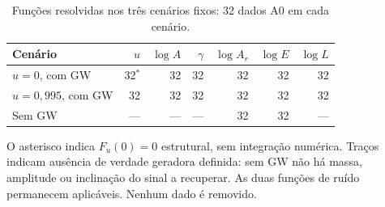 \begin{table}[htbp]
\centering
\caption{Funções resolvidas nos três cenários fixos: 32 dados A0 em cada cenário.}
\label{tab:c07-fixed-resolucao}
\begingroup\small\setlength{\tabcolsep}{4pt}
\begin{tabular}{@{}lrrrrrr@{}}
\toprule
Cenário & $u$ & $\log A$ & $\gamma$ & $\log A_r$ & $\log E$ & $\log L$ \\
\midrule
$u=0$, com GW & 32$^\ast$ & 32 & 32 & 32 & 32 & 32 \\
$u=0{,}995$, com GW & 32 & 32 & 32 & 32 & 32 & 32 \\
Sem GW & --- & --- & --- & 32 & 32 & --- \\
\bottomrule
\end{tabular}
\endgroup
\par\smallskip\begin{minipage}{0.96\textwidth}\footnotesize O asterisco indica $F_u(0)=0$ estrutural, sem integração numérica. Traços indicam ausência de verdade geradora definida: sem GW não há massa, amplitude ou inclinação do sinal a recuperar. As duas funções de ruído permanecem aplicáveis. Nenhum dado é removido.\end{minipage}
\end{table}
